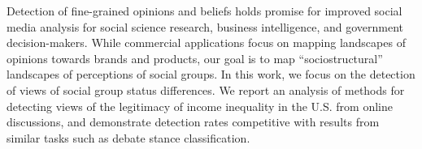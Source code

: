 Detection of fine-grained opinions and beliefs holds promise for improved social media analysis for social science research, business intelligence, and government decision-makers. While commercial applications focus on mapping landscapes of opinions towards brands and products, our goal is to map ``sociostructural'' landscapes of perceptions of social groups. In this work, we focus on the detection of views of social group status differences. We report an analysis of methods for detecting views of the legitimacy of income inequality in the U.S. from online discussions, and demonstrate detection rates competitive with results from similar tasks such as debate stance classification.
